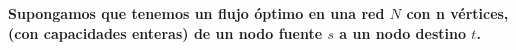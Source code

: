 \textbf{
    Supongamos que tenemos un flujo óptimo en una red $N$ con n vértices, (con capacidades
    enteras) de un nodo fuente $s$ a un nodo destino $t$.
}\vspace{.2cm}